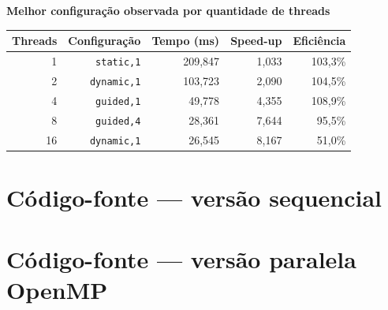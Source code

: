 \documentclass[10pt,a4paper]{article}
\begin{document}
\textbf{Melhor configuração observada por quantidade de threads}

\begin{center}
\begin{tabular}{rrrrr}
\toprule
Threads & Configuração & Tempo (ms) & Speed-up & Eficiência \\
\midrule
1  & \texttt{static,1}  & 209,847 & 1,033 & 103,3\% \\
2  & \texttt{dynamic,1} & 103,723 & 2,090 & 104,5\% \\
4  & \texttt{guided,1}  &  49,778 & 4,355 & 108,9\% \\
8  & \texttt{guided,4}  &  28,361 & 7,644 &  95,5\% \\
16 & \texttt{dynamic,1} &  26,545 & 8,167 &  51,0\% \\
\bottomrule
\end{tabular}
\end{center}

\clearpage
\section*{Código-fonte --- versão sequencial}


\clearpage
\section*{Código-fonte --- versão paralela OpenMP}

\end{document}
